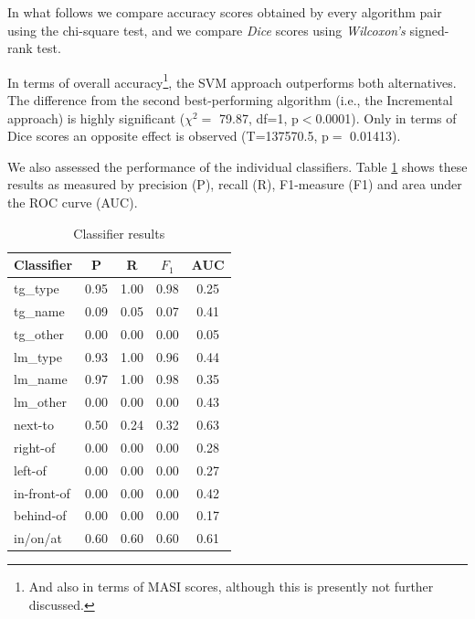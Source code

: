 \documentclass{article}
\begin{document}
In what follows we compare accuracy scores obtained by every algorithm pair using the chi-square test, and we compare {\em Dice} scores using {\em Wilcoxon's} signed-rank test.

In terms of overall accuracy\footnote{And also in terms of MASI scores, although this is presently not further discussed.}, the SVM approach outperforms both alternatives. The difference from the second best-performing algorithm (i.e., the Incremental approach) is highly significant ($\chi^{2}=$ 79.87, df=1, p$<$0.0001). Only in terms of Dice scores an opposite effect is observed (T=137570.5, p$=$ 0.01413). 

We also assessed the performance of the individual classifiers. Table \ref{tab-svm-results} shows these results as measured by precision (P), recall (R), F1-measure (F1) and area under the ROC curve (AUC). 

\begin{table}[ht]
\begin{center}
\footnotesize{
\caption{Classifier results}
\begin{tabular}{l c c c c }
\hline
{{Classifier}}	& {P} & {R} & {$F_{1}$} & {AUC} \\
\hline
{{tg\_type}} 			& 0.95 & 1.00 & 0.98 & 0.25 \\
{{tg\_name}}			& 0.09 & 0.05 & 0.07 & 0.41 \\
{{tg\_other}}			& 0.00 & 0.00 & 0.00 & 0.05 \\                               
{{lm\_type}}			& 0.93 & 1.00 & 0.96 & 0.44 \\                               
{{lm\_name}}			& 0.97 & 1.00 & 0.98 & 0.35 \\                               
{{lm\_other}}			& 0.00 & 0.00 & 0.00 & 0.43 \\                               
{{next-to}}				& 0.50 & 0.24 & 0.32 & 0.63 \\                               
{{right-of}}			& 0.00 & 0.00 & 0.00 & 0.28 \\                               
{{left-of}}				& 0.00 & 0.00 & 0.00 & 0.27 \\                               
{{in-front-of}}		& 0.00 & 0.00 & 0.00 & 0.42 \\                               
{{behind-of}}			& 0.00 & 0.00 & 0.00 & 0.17 \\                               
{{in/on/at}} 			& 0.60 & 0.60 & 0.60 & 0.61 \\                               
\hline                   
\end{tabular}
\label{tab-svm-results}
}
\end{center}
\end{table}
\normalsize
\end{document}
